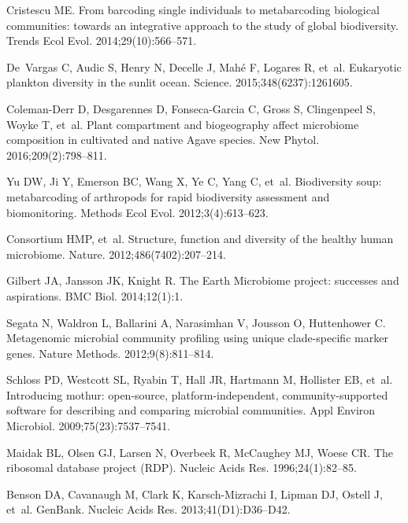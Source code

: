 \documentclass[10pt,letterpaper]{article}
\begin{document}
\begin{thebibliography}{10}
	
	Cristescu ME.
	\newblock From barcoding single individuals to metabarcoding biological
	communities: towards an integrative approach to the study of global
	biodiversity.
	\newblock Trends Ecol Evol. 2014;29(10):566--571.
	
	De~Vargas C, Audic S, Henry N, Decelle J, Mah{\'e} F, Logares R, et~al.
	\newblock Eukaryotic plankton diversity in the sunlit ocean.
	\newblock Science. 2015;348(6237):1261605.
	
	Coleman-Derr D, Desgarennes D, Fonseca-Garcia C, Gross S, Clingenpeel S, Woyke
	T, et~al.
	\newblock Plant compartment and biogeography affect microbiome composition in
	cultivated and native Agave species.
	\newblock New Phytol. 2016;209(2):798--811.
	
	Yu DW, Ji Y, Emerson BC, Wang X, Ye C, Yang C, et~al.
	\newblock Biodiversity soup: metabarcoding of arthropods for rapid biodiversity
	assessment and biomonitoring.
	\newblock Methods Ecol Evol. 2012;3(4):613--623.
	
	Consortium HMP, et~al.
	\newblock Structure, function and diversity of the healthy human microbiome.
	\newblock Nature. 2012;486(7402):207--214.
	
	Gilbert JA, Jansson JK, Knight R.
	\newblock The Earth Microbiome project: successes and aspirations.
	\newblock BMC Biol. 2014;12(1):1.
	
	Segata N, Waldron L, Ballarini A, Narasimhan V, Jousson O, Huttenhower C.
	\newblock Metagenomic microbial community profiling using unique clade-specific
	marker genes.
	\newblock Nature Methods. 2012;9(8):811--814.
	
	Schloss PD, Westcott SL, Ryabin T, Hall JR, Hartmann M, Hollister EB, et~al.
	\newblock Introducing mothur: open-source, platform-independent,
	community-supported software for describing and comparing microbial
	communities.
	\newblock Appl Environ Microbiol. 2009;75(23):7537--7541.
	
	Maidak BL, Olsen GJ, Larsen N, Overbeek R, McCaughey MJ, Woese CR.
	\newblock The ribosomal database project (RDP).
	\newblock Nucleic Acids Res. 1996;24(1):82--85.
	
	Benson DA, Cavanaugh M, Clark K, Karsch-Mizrachi I, Lipman DJ, Ostell J, et~al.
	\newblock GenBank.
	\newblock Nucleic Acids Res. 2013;41(D1):D36--D42.
	

\end{thebibliography}
\end{document}
